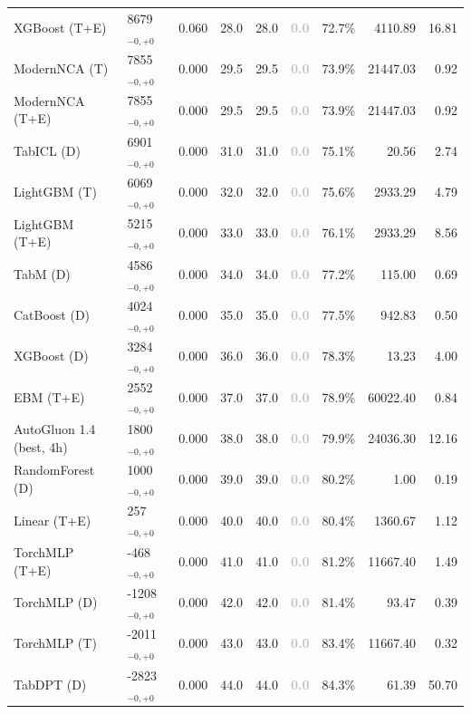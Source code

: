 \begin{tabular}{llcccccrr}
XGBoost (T+E) & 8679${}_{-0,+0}$ & 0.060 & 28.0 & 28.0 & \textcolor{silver}{\textbf{0.0}} & 72.7\% & 4110.89 & 16.81 \\
ModernNCA (T) & 7855${}_{-0,+0}$ & 0.000 & 29.5 & 29.5 & \textcolor{silver}{\textbf{0.0}} & 73.9\% & 21447.03 & 0.92 \\
ModernNCA (T+E) & 7855${}_{-0,+0}$ & 0.000 & 29.5 & 29.5 & \textcolor{silver}{\textbf{0.0}} & 73.9\% & 21447.03 & 0.92 \\
TabICL (D) & 6901${}_{-0,+0}$ & 0.000 & 31.0 & 31.0 & \textcolor{silver}{\textbf{0.0}} & 75.1\% & 20.56 & 2.74 \\
LightGBM (T) & 6069${}_{-0,+0}$ & 0.000 & 32.0 & 32.0 & \textcolor{silver}{\textbf{0.0}} & 75.6\% & 2933.29 & 4.79 \\
LightGBM (T+E) & 5215${}_{-0,+0}$ & 0.000 & 33.0 & 33.0 & \textcolor{silver}{\textbf{0.0}} & 76.1\% & 2933.29 & 8.56 \\
TabM (D) & 4586${}_{-0,+0}$ & 0.000 & 34.0 & 34.0 & \textcolor{silver}{\textbf{0.0}} & 77.2\% & 115.00 & 0.69 \\
CatBoost (D) & 4024${}_{-0,+0}$ & 0.000 & 35.0 & 35.0 & \textcolor{silver}{\textbf{0.0}} & 77.5\% & 942.83 & 0.50 \\
XGBoost (D) & 3284${}_{-0,+0}$ & 0.000 & 36.0 & 36.0 & \textcolor{silver}{\textbf{0.0}} & 78.3\% & 13.23 & 4.00 \\
EBM (T+E) & 2552${}_{-0,+0}$ & 0.000 & 37.0 & 37.0 & \textcolor{silver}{\textbf{0.0}} & 78.9\% & 60022.40 & 0.84 \\
AutoGluon 1.4 (best, 4h) & 1800${}_{-0,+0}$ & 0.000 & 38.0 & 38.0 & \textcolor{silver}{\textbf{0.0}} & 79.9\% & 24036.30 & 12.16 \\
RandomForest (D) & 1000${}_{-0,+0}$ & 0.000 & 39.0 & 39.0 & \textcolor{silver}{\textbf{0.0}} & 80.2\% & 1.00 & 0.19 \\
Linear (T+E) & 257${}_{-0,+0}$ & 0.000 & 40.0 & 40.0 & \textcolor{silver}{\textbf{0.0}} & 80.4\% & 1360.67 & 1.12 \\
TorchMLP (T+E) & -468${}_{-0,+0}$ & 0.000 & 41.0 & 41.0 & \textcolor{silver}{\textbf{0.0}} & 81.2\% & 11667.40 & 1.49 \\
TorchMLP (D) & -1208${}_{-0,+0}$ & 0.000 & 42.0 & 42.0 & \textcolor{silver}{\textbf{0.0}} & 81.4\% & 93.47 & 0.39 \\
TorchMLP (T) & -2011${}_{-0,+0}$ & 0.000 & 43.0 & 43.0 & \textcolor{silver}{\textbf{0.0}} & 83.4\% & 11667.40 & 0.32 \\
TabDPT (D) & -2823${}_{-0,+0}$ & 0.000 & 44.0 & 44.0 & \textcolor{silver}{\textbf{0.0}} & 84.3\% & 61.39 & 50.70 \\

\end{tabular}
